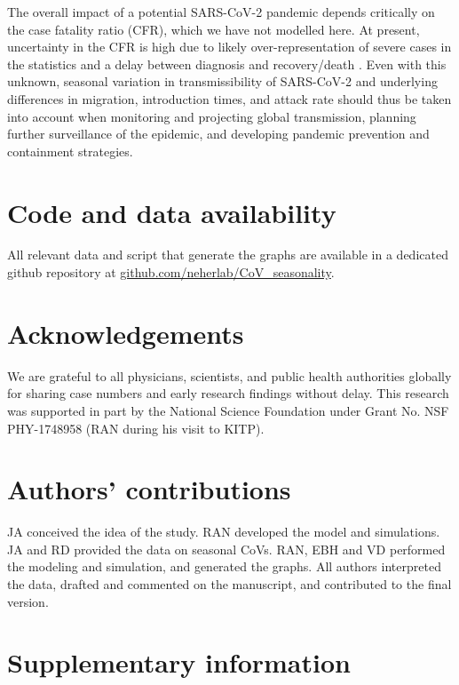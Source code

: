 \documentclass[rmp, reprint, superscriptaddress, floatfix,amsmath]{revtex4-1}
\begin{document}
The overall impact of a potential SARS-CoV-2 pandemic depends critically on the case fatality ratio (CFR), which we have not modelled here. 
At present, uncertainty in the CFR is high due to likely over-representation of severe cases in the statistics and a delay between diagnosis and recovery/death  \citep{battegay_2019-novel_2020}. 
Even with this unknown, seasonal variation in transmissibility of SARS-CoV-2 and underlying differences in migration, introduction times, and attack rate should thus be taken into account when monitoring and projecting global transmission, planning further surveillance of the epidemic, and developing pandemic prevention and containment strategies.

\section{Code and data availability}
All relevant data and script that generate the graphs are available in a dedicated github repository at \url{github.com/neherlab/CoV_seasonality}.

\section*{Acknowledgements}
We are grateful to all physicians, scientists, and public health authorities globally for sharing case numbers and early research findings without delay. 
This research was supported in part by the National Science Foundation under Grant No. NSF PHY-1748958 (RAN during his visit to KITP).

\section*{Authors' contributions}
JA conceived the idea of the study. RAN developed the model and simulations. JA and RD provided the data on seasonal CoVs. RAN, EBH and VD performed the modeling and simulation, and generated the graphs. All authors interpreted the data, drafted and commented on the manuscript, and contributed to the final version. 



\newpage

\appendix
\setcounter{figure}{0}
\renewcommand{\figurename}{Figure S}
\setcounter{table}{0}
\renewcommand{\tablename}{Table S}

\section*{Supplementary information}
\end{document}
